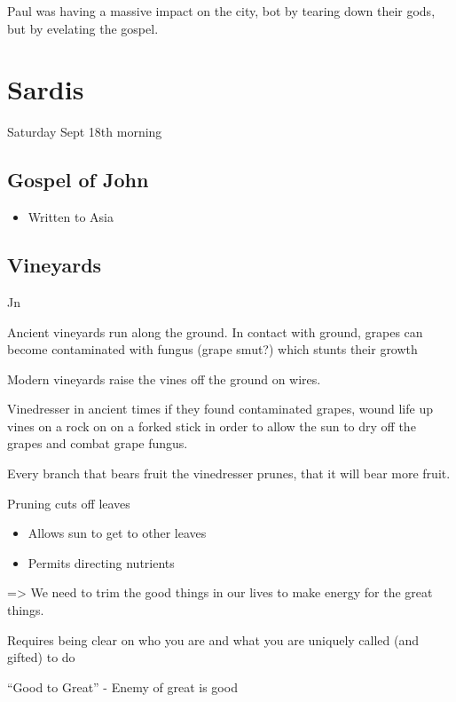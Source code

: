 \documentclass[
]{book}
\providecommand{\tightlist}{%
  \setlength{\itemsep}{0pt}\setlength{\parskip}{0pt}}
\begin{document}
Paul was having a massive impact on the city, bot by tearing down their gods, but by evelating the gospel.

\hypertarget{sardis}{%
\chapter{Sardis}\label{sardis}}

Saturday Sept 18th morning

\hypertarget{gospel-of-john}{%
\section{Gospel of John}\label{gospel-of-john}}

\begin{itemize}
\tightlist
\item
  Written to Asia
\end{itemize}

\hypertarget{vineyards}{%
\section{Vineyards}\label{vineyards}}

Jn

Ancient vineyards run along the ground. In contact with ground, grapes can become contaminated with fungus (grape smut?) which stunts their growth

Modern vineyards raise the vines off the ground on wires.

Vinedresser in ancient times if they found contaminated grapes, wound life up vines on a rock on on a forked stick in order to allow the sun to dry off the grapes and combat grape fungus.

Every branch that bears fruit the vinedresser prunes, that it will bear more fruit.

Pruning cuts off leaves

\begin{itemize}
\tightlist
\item
  Allows sun to get to other leaves
\item
  Permits directing nutrients
\end{itemize}

=\textgreater{} We need to trim the good things in our lives to make energy for the great things.

Requires being clear on who you are and what you are uniquely called (and gifted) to do

``Good to Great'' - Enemy of great is good
\end{document}
